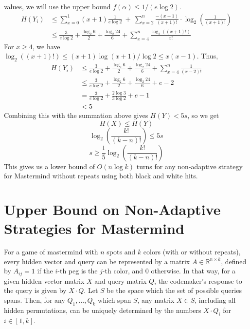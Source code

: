 \documentclass[12pt, a4paper]{article}
\begin{document}
values, we will use the upper bound $f(\alpha)\le 1/(e\log2)$.
    \begin{align*}
	H(Y_i)&\le \sum_{x=0}^1 (x+1)\frac{1}{e\log2}~+~\sum_{x=2}^n \frac{-(x+1)}{(x+1)!}
	\cdot\log_2 \left(\frac{1}{(x+1)!}\right)\\
    &\le\frac{3}{e\log2}+\frac{\log_2 6}{2}+\frac{\log_2 24}{6}+\sum_{x=4}^n
    \frac{\log_2((x+1)!)}{x!}
    \end{align*}
    For $x\ge 4$, we have $\log_2((x+1)!)\le (x+1)\log(x+1)/\log 2\le x(x-1)$.
    Thus,
    \begin{align*}
	H(Y_i)&\le\frac{3}{e\log2}+\frac{\log_2 6}{2}+\frac{\log_2 24}{6}+\sum_{x=4}^n 
	\frac{1}{(x-2)!}\\
    &\le\frac{3}{e\log2}+\frac{\log_2 6}{2}+\frac{\log_2 24}{6}+e-2\\
    &=\frac{3}{e\log2}+\frac{2\log 3}{3\log 2}+e-1\\
    &<5
    \end{align*}
Combining this with the summation above gives $H(Y)<5s$, so we get
    \begin{equation*}
    H(X)\le H(Y)
    \end{equation*}
    \begin{equation*}
    \log_2 \left(\frac{k!}{(k-n)!}\right)\le 5s
    \end{equation*}
    \begin{equation*}
    s\ge\frac{1}{5}\log_2 \left(\frac{k!}{(k-n)!}\right)
    \end{equation*}
    \quad
This gives us a lower bound of $O(n\log k)$ turns for any non-adaptive strategy for
Mastermind without repeats using both black and white hits.

\clearpage
\section*{Upper Bound on Non-Adaptive Strategies for Mastermind}
For a game of mastermind with $n$ spots and $k$ colors (with or without repeats), every
hidden vector and query can be represented by a matrix $A\in\mathbb{R}^{n\times k}$,
defined by $A_{ij}=1$ if the $i$-th peg is the $j$-th color, and 0 otherwise.
In that way, for a given hidden vector matrix $X$ and query matrix $Q$,
the codemaker's response to the query is given by $X\cdot Q$.
Let $S$ be the space which the set of possible queries spans. Then, for any
$Q_1, \ldots, Q_k$ which span $S$, any matrix $X\in S$, including all hidden
permutations, can be uniquely determined by the numbers $X\cdot Q_i$ for $i\in [1,k]$.
\end{document}
